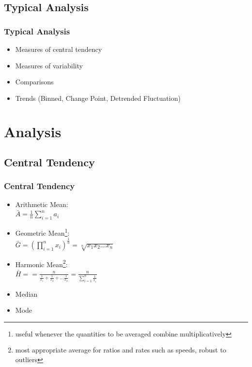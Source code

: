 \documentclass{beamer} %
\begin{document}
	\subsection{Typical Analysis}
	\begin{frame}
	\frametitle{Typical Analysis}
		\begin{itemize}
			\item Measures of central tendency
			\item Measures of variability
			\item Comparisons
			\item Trends (Binned, Change Point, Detrended Fluctuation)
		\end{itemize}
	\end{frame}

\section{Analysis}
	\subsection{Central Tendency}
	\begin{frame}
		\frametitle{Central Tendency}
		\begin{itemize}
			\item Arithmetic Mean:\\ $\bar{A} = \frac{1}{n} \sum_{i=1}^{n}a_i$\vspace{.125in}
			\item Geometric Mean\footnote{useful whenever the quantities to be averaged combine multiplicatively}:\\ $\bar{G} = \left(\prod_{i=1}^n x_i\right)^{\frac{1}{n}} = \sqrt[n]{x_1 x_2 \ldots x_n}$\vspace{.125in}
			\item Harmonic Mean\footnote{most appropriate average for ratios and rates such as speeds, robust to outliers}:\\ $\bar{H} == \frac{n}{\frac{1}{x_1} + \frac{1}{x_2} + \ldots \frac{1}{x_n}} = \frac{n}{\sum_{i=1}^n \frac{1}{x_i}}$\vspace{.125in}
			\item Median
			\item Mode
		\end{itemize}
	\end{frame}
	
\end{document}
